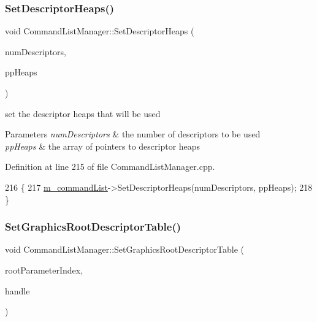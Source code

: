 \subsubsection{\texorpdfstring{Set\+Descriptor\+Heaps()}{SetDescriptorHeaps()}}
{\footnotesize\ttfamily void Command\+List\+Manager\+::\+Set\+Descriptor\+Heaps (\begin{DoxyParamCaption}\item[{U\+I\+NT}]{num\+Descriptors,  }\item[{I\+D3\+D12\+Descriptor\+Heap $\ast$const $\ast$}]{pp\+Heaps }\end{DoxyParamCaption})}



set the descriptor heaps that will be used 


\begin{DoxyParams}{Parameters}
{\em num\+Descriptors} & the number of descriptors to be used \\
\hline
{\em pp\+Heaps} & the array of pointers to descriptor heaps \\
\hline
\end{DoxyParams}


Definition at line 215 of file Command\+List\+Manager.\+cpp.


\begin{DoxyCode}
216 \{
217     \mbox{\hyperlink{class_command_list_manager_a1366f0acddca408167ffcab59be71ddb}{m\_commandList}}->SetDescriptorHeaps(numDescriptors, ppHeaps);
218 \}
\end{DoxyCode}
\mbox{\label{class_command_list_manager_aa3a6aaa40f655f816e1e0ec49e3ce25b}} 
\subsubsection{\texorpdfstring{Set\+Graphics\+Root\+Descriptor\+Table()}{SetGraphicsRootDescriptorTable()}}
{\footnotesize\ttfamily void Command\+List\+Manager\+::\+Set\+Graphics\+Root\+Descriptor\+Table (\begin{DoxyParamCaption}\item[{int}]{root\+Parameter\+Index,  }\item[{const C\+D3\+D\+X12\+\_\+\+G\+P\+U\+\_\+\+D\+E\+S\+C\+R\+I\+P\+T\+O\+R\+\_\+\+H\+A\+N\+D\+LE \&}]{handle }\end{DoxyParamCaption})}



